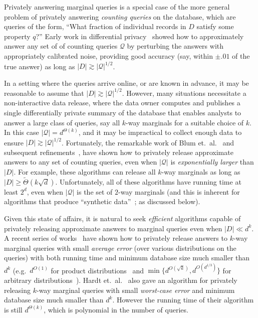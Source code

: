 \documentclass[11pt]{article}
\newcommand\cQ{\mathcal{Q}}
\theoremstyle{definition}
\begin{document}
Privately answering marginal queries is a special case of the more general problem of privately answering \emph{counting queries} on the database, which are queries of the form, ``What fraction of individual records in $D$ satisfy some property $q$?''  Early work in differential privacy~\cite{DinurNi03,BlumDwMcNi05,DworkMcNiSm06} showed how to approximately answer any set of of counting queries $\cQ$ by perturbing the answers with appropriately calibrated noise, providing good accuracy (say, within $\pm .01$ of the true answer) as long as $|D| \gtrsim |\cQ|^{1/2}$.

In a setting where the queries arrive online, or are known in advance, it may be reasonable to assume that $|D| \gtrsim |\cQ|^{1/2}$.  However, many situations necessitate a non-interactive data release, where the data owner computes and publishes a single differentially private summary of the database that enables analysts to answer a large class of queries, say all $k$-way marginals for a suitable choice of $k$.  In this case $|\cQ| = d^{\Theta(k)}$, and it may be impractical to collect enough data to ensure $|D| \gtrsim |\cQ|^{1/2}$.  Fortunately, the remarkable work of Blum et.~al.~\cite{BlumLiRo08} and subsequent refinements~\cite{DworkNaReRoVa09,DworkRoVa10,RothRo10,HardtRo10,HardtLiMc10,GuptaRoUl12}, have shown how to privately release approximate answers to any set of counting queries, even when $|\cQ|$ is \emph{exponentially larger} than $|D|$.  For example, these algorithms can release all $k$-way marginals as long as $|D| \geq \tilde{\Theta}(k\sqrt{d})$.  Unfortunately, all of these algorithms have running time at least $2^{d}$, even when $|\cQ|$ is the set of $2$-way marginals (and this is inherent for algorithms that produce ``synthetic data''~\cite{UllmanVa11}; as discussed below).

Given this state of affairs, it is natural to seek \emph{efficient} algorithms capable of privately releasing approximate answers to marginal queries even when $|D| \ll d^k$.  A recent series of works~\cite{GuptaHaRoUl11,CheraghchiKlKoLe12,HardtRoSe12} have shown how to privately release answers to $k$-way marginal queries with small \emph{average error} (over various distributions on the queries) with both running time and minimum database size much smaller than $d^{k}$ (e.g.~$d^{O(1)}$ for product distributions~\cite{GuptaHaRoUl11,CheraghchiKlKoLe12} and $\min\{d^{O(\sqrt{k})}, d^{O(d^{1/3})}\}$ for arbitrary distributions~\cite{HardtRoSe12}).  Hardt et.~al.~\cite{HardtRoSe12} also gave an algorithm for privately releasing $k$-way marginal queries with small \emph{worst-case error} and minimum database size much smaller than $d^{k}$. However the running time of their algorithm is still $d^{\Theta(k)}$, which is polynomial in the number of queries.
\end{document}
